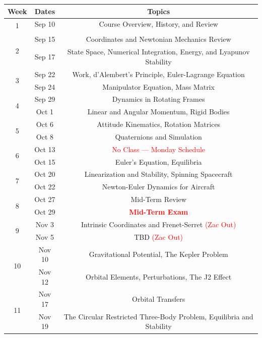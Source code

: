\documentclass[11pt,letterpaper]{article}
\begin{document}
\begin{tabular}{c|c|c}
	Week & Dates & Topics \\
	\hline
	\multirow{2}{*}{1} & Sep 10 & 
        Course Overview, History, and Review \\
	 	&  & \\
	\hline
	\multirow{2}{*}{2} & Sep 15 &
        Coordinates and Newtonian Mechanics Review \\
	 	& Sep 17 &
	 	State Space, Numerical Integration, Energy, and Lyapunov Stability \\
	\hline
	\multirow{2}{*}{3} & Sep 22 &
        Work, d'Alembert's Principle, Euler-Lagrange Equation \\
	 	& Sep 24 &
	 	Manipulator Equation, Mass Matrix \\
	\hline
	\multirow{2}{*}{4}  & Sep 29 &
        Dynamics in Rotating Frames \\
	 	& Oct 1 &
	 	Linear and Angular Momentum, Rigid Bodies \\
	\hline
	\multirow{2}{*}{5}  & Oct 6 &
		Attitude Kinematics, Rotation Matrices \\
	 	& Oct 8 &
	 	Quaternions and Simulation \\
	\hline
	\multirow{2}{*}{6}  & Oct 13 &
		\textcolor{red}{No Class --- Monday Schedule} \\
	 	& Oct 15 &
	 	Euler's Equation, Equilibria \\
	\hline
	\multirow{2}{*}{7}  & Oct 20 &
		Linearization and Stability, Spinning Spacecraft \\
	 	& Oct 22 &
	 	Newton-Euler Dynamics for Aircraft \\
	\hline
	\multirow{2}{*}{8}  & Oct 27 &
		Mid-Term Review \\
	 	& Oct 29 &
	 	\textcolor{red}{\textbf{Mid-Term Exam}} \\
	\hline
	\multirow{2}{*}{9}  & Nov 3 &
		Intrinsic Coordinates and Frenet-Serret \textcolor{red}{(Zac Out)} \\
	 	& Nov 5 &
	 	TBD \textcolor{red}{(Zac Out)} \\
	\hline
	\multirow{2}{*}{10}  & Nov 10 &
		Gravitational Potential, The Kepler Problem \\
	 	& Nov 12 &
	 	Orbital Elements, Perturbations, The J2 Effect \\
	 \hline
	\multirow{2}{*}{11}  & Nov 17 &
		Orbital Transfers \\
	 	& Nov 19 &
		The Circular Restricted Three-Body Problem, Equilibria and Stability \\
	 \hline

\end{tabular}
\end{document}
